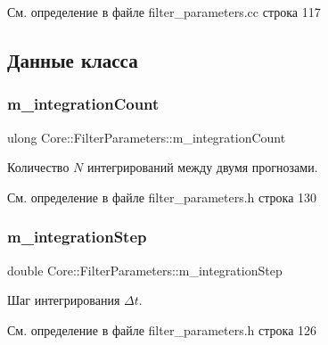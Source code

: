 См. определение в файле filter\+\_\+parameters.\+cc строка 117



\subsection{Данные класса}
\hypertarget{class_core_1_1_filter_parameters_af28ca1d6c952ad42a5dfbeb6a7e916e5}{}\label{class_core_1_1_filter_parameters_af28ca1d6c952ad42a5dfbeb6a7e916e5} 
\subsubsection{\texorpdfstring{m\+\_\+integration\+Count}{m\_integrationCount}}
{\footnotesize\ttfamily ulong Core\+::\+Filter\+Parameters\+::m\+\_\+integration\+Count\hspace{0.3cm}{\ttfamily [private]}}

Количество $N$ интегрирований между двумя прогнозами. 

См. определение в файле filter\+\_\+parameters.\+h строка 130

\hypertarget{class_core_1_1_filter_parameters_ab63c375a5b76a516da339b058af687ae}{}\label{class_core_1_1_filter_parameters_ab63c375a5b76a516da339b058af687ae} 
\subsubsection{\texorpdfstring{m\+\_\+integration\+Step}{m\_integrationStep}}
{\footnotesize\ttfamily double Core\+::\+Filter\+Parameters\+::m\+\_\+integration\+Step\hspace{0.3cm}{\ttfamily [private]}}

Шаг интегрирования $\Delta t$. 

См. определение в файле filter\+\_\+parameters.\+h строка 126

\hypertarget{class_core_1_1_filter_parameters_a5f906190ee024f4df75f8279e9986f2c}{}\label{class_core_1_1_filter_parameters_a5f906190ee024f4df75f8279e9986f2c} 
